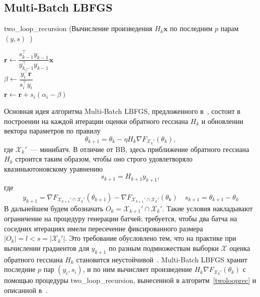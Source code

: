 \documentclass[preprint,12pt]{elsarticle}
\begin{document}
{\subsection{Multi-Batch LBFGS}\label{SS:2.4}
\begin{algorithm}[H]\label{twolooprec}
\caption {two\_loop\_recursion \newline
(Вычисление произведения $H_k\mathbf{x}$ по последним $p$ парам $(y, s)$~\cite{numopt})}
\SetAlgoLined
{}
 $\mathbf{r} \leftarrow \dfrac{s_{k-1}^\top y_{k-1}}{y_{k-1}^\top y_{k-1}}\mathbf{x}$\\
  {
    $\beta \leftarrow \dfrac{y_i^\top \mathbf{r}}{s_i^\top y_i}$\\
    $\mathbf{r} \leftarrow \mathbf{r} + s_i(\alpha_i - \beta)$\\
 }
\end{algorithm}
Основная идея алгоритма Multi-Batch LBFGS, предложенного в~\cite{multibatchLBFGS}, состоит в построении на каждой итерации оценки обратного гессиана $H_k$ и обновлении вектора параметров по правилу
\[ 
    \theta_{k+1} = \theta_k - \eta H_k \nabla F_{\mathcal{X}_k'}(\theta_k),
\]
где $\mathcal{X}_k'$~--- минибатч. 
В отличие от BB, здесь приближение обратного гессиана $H_k$ строится таким образом, чтобы оно строго удовлетворяло квазиньютоновскому уравнению
\[s_{k+1} = H_{k+1}y_{k+1},\]
где
\[y_{k+1} = \nabla F_{\mathcal{X}_{k+1}' \cap \mathcal{X}_k'}(\theta_{k+1}) - \nabla F_{\mathcal{X}_{k+1}' \cap \mathcal{X}_k'}(\theta_k) \quad s_{k+1} = \theta_{k+1} - \theta_k\]
В дальнейшем будем обозначать $O_k = \mathcal{X}_{k+1}' \cap \mathcal{X}_k'$. 
Такие условия накладывают ограничение на процедуру генерации батчей: требуется, чтобы два батча на соседних итерациях имели пересечение фиксированного размера $|O_k| = l < s = |\mathcal{X}_k'|$. 
Это требование обусловлено тем, что на практике при вычислении градиентов для $y_{k+1}$ по разным подмножествам выборки $\mathcal{X}$ оценка обратного гессиана $H_k$ становится неустойчивой~\cite{LBFGSunstable}. 
Multi-Batch LBFGS хранит последние $p$ пар $(y_i, s_i)$, и по ним вычисляет произведение $H_k \nabla F_{\mathcal{X}_k'}(\theta_k)$ с помощью процедуры two\_loop\_recursion, вынесенной в алгоритм~\ref{twolooprec} и описанной в~\cite{numopt}. 
}
\end{document}
